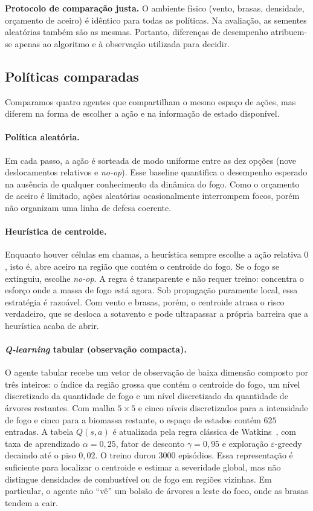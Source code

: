 \documentclass[11pt,a4paper]{article}
\begin{document}
\textbf{Protocolo de comparação justa.}
O ambiente físico (vento, brasas, densidade, orçamento de aceiro) é idêntico
para todas as políticas.
Na avaliação, as sementes aleatórias também são as mesmas.
Portanto, diferenças de desempenho atribuem-se apenas ao algoritmo e à
observação utilizada para decidir.

\subsection{Políticas comparadas}
\label{sec:politicas}

Comparamos quatro agentes que compartilham o mesmo espaço de ações, mas
diferem na forma de escolher a ação e na informação de estado disponível.

\paragraph{Política aleatória.}
Em cada passo, a ação é sorteada de modo uniforme entre as dez opções
(nove deslocamentos relativos e \emph{no-op}).
Esse baseline quantifica o desempenho esperado na ausência de qualquer
conhecimento da dinâmica do fogo.
Como o orçamento de aceiro é limitado, ações aleatórias ocasionalmente
interrompem focos, porém não organizam uma linha de defesa coerente.

\paragraph{Heurística de centroide.}
Enquanto houver células em chamas, a heurística sempre escolhe a ação
relativa $0$, isto é, abre aceiro na região que contém o centroide do fogo.
Se o fogo se extinguiu, escolhe \emph{no-op}.
A regra é transparente e não requer treino: concentra o esforço onde a massa
de fogo está agora.
Sob propagação puramente local, essa estratégia é razoável.
Com vento e brasas, porém, o centroide atrasa o risco verdadeiro, que se
desloca a sotavento e pode ultrapassar a própria barreira que a heurística acaba
de abrir.

\paragraph{\emph{Q-learning} tabular (observação compacta).}
O agente tabular recebe um vetor de observação de baixa dimensão composto por
três inteiros: o índice da região grossa que contém o centroide do fogo, um
nível discretizado da quantidade de fogo e um nível discretizado da quantidade
de árvores restantes.
Com malha $5\times 5$ e cinco níveis discretizados para a intensidade de fogo e
cinco para a biomassa restante, o espaço
de estados contém $625$ entradas.
A tabela $Q(s,a)$ é atualizada pela regra clássica de
Watkins~\cite{sutton2018}, com taxa de aprendizado $\alpha=0{,}25$, fator de
desconto $\gamma=0{,}95$ e exploração $\varepsilon$-greedy decaindo até o piso
$0{,}02$.
O treino durou $3000$ episódios.
Essa representação é suficiente para localizar o centroide e estimar a
severidade global, mas não distingue densidades de combustível ou de fogo em
regiões vizinhas.
Em particular, o agente não ``vê'' um bolsão de árvores a leste do foco, onde
as brasas tendem a cair.
\end{document}
